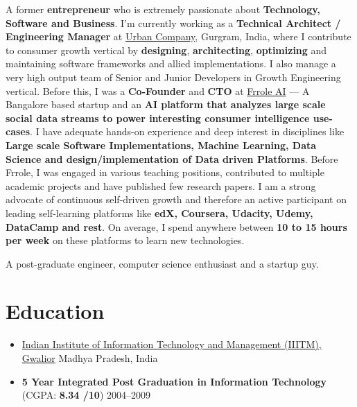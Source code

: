 \documentclass{article}
\begin{document}
\ifresearch
A former \textbf{entrepreneur} who is extremely passionate about \textbf{Technology, Software and Business}. I'm currently working as a \textbf{Technical Architect / Engineering Manager} at \href{https://www.urbancompany.com}{Urban Company}, Gurgram, India, where I contribute to consumer growth vertical by \textbf{designing}, \textbf{architecting}, \textbf{optimizing} and maintaining software frameworks and allied implementations. I also manage a very high output team of Senior and Junior Developers in Growth Engineering vertical.  Before this, I was a \textbf{Co-Founder} and \textbf{CTO} at \href{http://www.frrole.ai}{Frrole AI} --- A Bangalore based startup and an \textbf{AI platform that analyzes large scale social data streams to power interesting consumer intelligence use-cases}. I have adequate hands-on experience and deep interest in disciplines like \textbf{Large scale Software Implementations, Machine Learning, Data Science and design/implementation of Data driven Platforms}. Before Frrole, I was engaged in various teaching positions, contributed to multiple academic projects and have published few research papers. I am a strong advocate of continuous self-driven growth and therefore an active participant on leading self-learning platforms like \textbf{edX, Coursera, Udacity, Udemy, DataCamp and rest}. On average, I spend anywhere between \textbf{10 to 15 hours per week} on these platforms to learn new technologies.
\else

A post-graduate engineer, computer science enthusiast and a startup guy.  

\fi

\section{Education}
\begin{itemize}[leftmargin=-0.1ex]\setlength\itemsep{0.25em}\vspace{-10pt}
  \item[]  \href{http://iiitm.ac.in}{Indian Institute of Information Technology and Management (IIITM), Gwalior} \hfill Madhya Pradesh, India
  \item[] \textbf{5 Year Integrated Post Graduation in Information Technology} (CGPA: \textbf{8.34 /10}) \hfill 2004--2009
\end{itemize}\vspace{-3pt}
\end{document}

